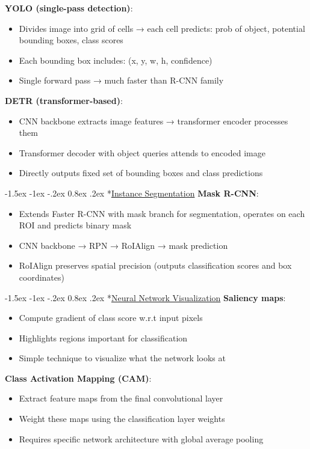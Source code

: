 \documentclass{article}
\makeatletter
\renewcommand\section{\@startsection{section}{1}{\z@}%
                                  {-1.5ex \@plus -1ex \@minus -.2ex}%
                                  {0.8ex \@plus.2ex}%
                                  {\normalfont\small\bfseries}}
\makeatother
\begin{document}
\begin{multicols}{3}
\textbf{YOLO (single-pass detection)}:
\begin{itemize}
\item Divides image into grid of cells → each cell predicts: prob of object, potential bounding boxes, class scores
\item Each bounding box includes: (x, y, w, h, confidence)
\item Single forward pass → much faster than R-CNN family
\end{itemize}

\textbf{DETR (transformer-based)}:
\begin{itemize}
\item CNN backbone extracts image features → transformer encoder processes them
\item Transformer decoder with object queries attends to encoded image
\item Directly outputs fixed set of bounding boxes and class predictions
\end{itemize}

\section*{\underline{Instance Segmentation}}
\textbf{Mask R-CNN}:
\begin{itemize}
\item Extends Faster R-CNN with mask branch for segmentation, operates on each ROI and predicts binary mask
\item CNN backbone → RPN → RoIAlign → mask prediction
\item RoIAlign preserves spatial precision (outputs classification scores and box coordinates)
\end{itemize}

\section*{\underline{Neural Network Visualization}}
\textbf{Saliency maps}:
\begin{itemize}
\item Compute gradient of class score w.r.t input pixels
\item Highlights regions important for classification
\item Simple technique to visualize what the network looks at
\end{itemize}

\textbf{Class Activation Mapping (CAM)}:
\begin{itemize}
\item Extract feature maps from the final convolutional layer
\item Weight these maps using the classification layer weights
\item Requires specific network architecture with global average pooling
\end{itemize}


\end{multicols}
\end{document}

